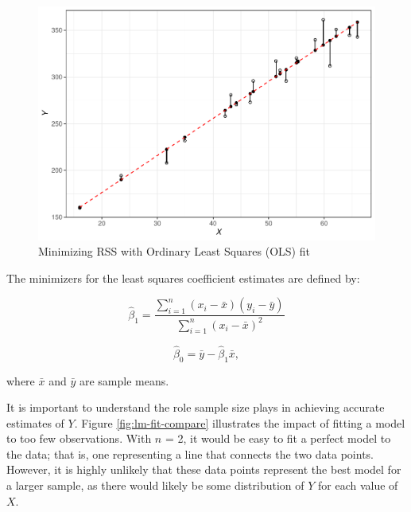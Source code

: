 \documentclass[
]{book}
\begin{document}
\begin{figure}

{\centering \includegraphics[width=1\linewidth]{The_Fundamentals_of_People_Analytics_files/figure-latex/lm-residuals-1} 

}

\caption{Minimizing RSS with Ordinary Least Squares (OLS) fit}\label{fig:lm-residuals}
\end{figure}

The minimizers for the least squares coefficient estimates are defined by:

\[\hat\beta_1 = \frac{\displaystyle\sum_{i=1}^{n}(x_i - \bar{x})(y_i - \bar{y})} {\displaystyle\sum_{i=1}^{n}(x_i - \bar{x})^2}\]

\[\hat\beta_0 = \bar{y} - \hat{\beta}_1 \bar{x},\]

where \(\bar{x}\) and \(\bar{y}\) are sample means.

It is important to understand the role sample size plays in achieving accurate estimates of \(Y\). Figure \ref{fig:lm-fit-compare} illustrates the impact of fitting a model to too few observations. With \(n\) = 2, it would be easy to fit a perfect model to the data; that is, one representing a line that connects the two data points. However, it is highly unlikely that these data points represent the best model for a larger sample, as there would likely be some distribution of \(Y\) for each value of \(X\).
\end{document}

